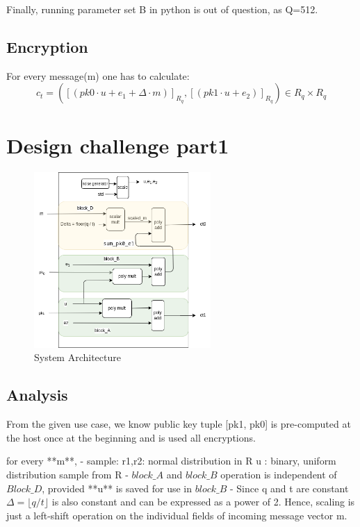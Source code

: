 \documentclass{article}
\begin{document}
      Finally, running parameter set B in python is out of question, as Q=512.

    \subsection{Encryption}

    For every message(m) one has to calculate: 
    $$
    c_t = \left( \left[ (pk0 \cdot u + e_1 + \Delta \cdot m) \right]_{R_q} ,
                 \left[ (pk1 \cdot u + e_2) \right]_{R_q} \right)  \in {R_q}\times {R_q}
    $$
    


    \section{Design challenge part1}

    \begin{figure}[htp] 
      \centering
      \includegraphics[width=0.6\textwidth]{FV12_encryption.png}
      \caption{System Architecture}
      \label{fig:sysarch} 
    \end{figure}

    \subsection{Analysis}
    From the given use case, we know public key tuple [pk1, pk0] is pre-computed at the host once at the beginning and is used all encryptions.

    for every **m**,
    - sample: r1,r2: normal distribution in R
              u : binary, uniform distribution sample from R
    - $block\_A$  and $block\_B$ operation is independent of $Block\_D$, provided **u** is saved for use in $block\_B$
    - Since q and t are constant $\Delta=\lfloor q/t \rfloor$ is also constant and can be expressed as a power of 2. Hence, scaling is just a left-shift operation on the individual fields of incoming message vector m. 
    
\end{document}

